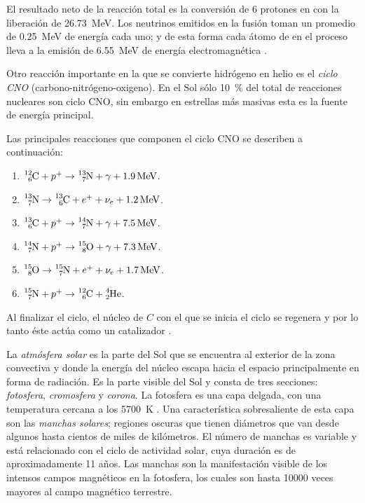 El resultado neto de la reacción total es la conversión de \num{6} protones en  con la liberación de \SI{26.73}{\mega\electronvolt}. Los neutrinos emitidos en la fusión toman un promedio de \SI{0.25}{\mega\electronvolt} de energía cada uno; y de esta forma cada átomo de  en el proceso lleva a la emisión de \SI{6.55}{\mega\electronvolt} de energía electromagnética \cite{noyes82}.

Otro reacción importante en la que se convierte hidrógeno en helio es el \emph{ciclo CNO} (carbono-nitrógeno-oxigeno). En el Sol sólo \SI{10}{\percent} del total de reacciones nucleares son ciclo CNO, sin embargo en estrellas más masivas esta es la fuente de energía principal.

Las principales reacciones que componen el ciclo CNO se describen a continuación:

\begin{enumerate}
	\item $\ce{_{6}^{12}C}+p^{+}\rightarrow\ce{_{7}^{13}N}+\gamma+\SI{1.9}{\mega\electronvolt}$.
	\item $\ce{_{7}^{13}N}\rightarrow\ce{_{6}^{13}C}+e^{+}+\nu_{e}+\SI{1.2}{\mega\electronvolt}$.
	\item $\ce{_{6}^{13}C}+p^{+}\rightarrow\ce{_{7}^{14}N}+\gamma+\SI{7.5}{\mega\electronvolt}$.
	\item $\ce{_{7}^{14}N}+p^{+}\rightarrow\ce{_{8}^{15}O}+\gamma+\SI{7.3}{\mega\electronvolt}$.
	\item $\ce{_{8}^{15}O}\rightarrow\ce{_{7}^{15}N}+e^{+}+\nu_{e}+\SI{1.7}{\mega\electronvolt}$.
	\item $\ce{_{7}^{15}N}+p^{+}\rightarrow\ce{_{6}^{12}C}+\ce{_{2}^{4}He}$.
\end{enumerate}

Al finalizar el ciclo, el núcleo de $C$ con el que se inicia el ciclo se regenera y por lo tanto éste actúa como un catalizador \cite{golub14}.

La \emph{atmósfera solar} es la parte del Sol que se encuentra al exterior de la zona convectiva y donde la energía del núcleo escapa hacia el espacio principalmente en forma de radiación. Es la parte visible del Sol y consta de tres secciones: \emph{fotosfera}, \emph{cromosfera} y \emph{corona}. La fotosfera es una capa delgada, con una temperatura cercana a los \SI{5700}{\kelvin} \cite{noyes82}. Una característica sobresaliente de esta capa son las \emph{manchas solares}; regiones oscuras que tienen diámetros que van desde algunos hasta cientos de miles de kilómetros. El número de manchas es variable y está relacionado con el ciclo de actividad solar, cuya duración es de aproximadamente \num{11} años. Las manchas son la manifestación visible de los intensos campos magnéticos en la fotosfera, los cuales son hasta \num{10000} veces mayores al campo magnético terrestre.

